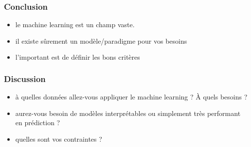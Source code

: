 \documentclass{formation}
\begin{document}
\begin{frame}
  \frametitle{Conclusion}
  \begin{itemize}
  \item le machine learning est un champ vaste.
  \item il existe sûrement un modèle/paradigme pour vos besoins
  \item l'important est de définir les bons critères
  \end{itemize}
\end{frame}

\begin{frame}
  \frametitle{Discussion}
  \begin{itemize}
  \item à quelles données allez-vous appliquer le machine learning ? À
    quels besoins ?
  \item aurez-vous besoin de modèles interprétables ou simplement très
    performant en prédiction ?
  \item quelles sont vos contraintes ?
  \end{itemize}
\end{frame}
\end{document}
